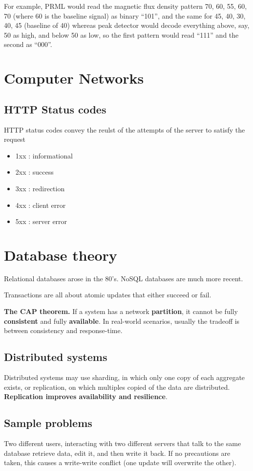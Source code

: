 \documentclass[oneside]{book} %
\theoremstyle{plain}
\begin{document}
For example, PRML would read the magnetic flux density pattern 70, 60, 55, 60,
70 (where 60 is the baseline signal) as binary ``101'', and the same for 45, 40,
30, 40, 45 (baseline of 40) whereas peak detector would decode everything
above, say, 50 as high, and below 50 as low, so the first pattern would read
``111'' and the second as ``000''.

\chapter{Computer Networks}
\section{HTTP Status codes}
HTTP status codes convey the reulst of the attempts of the server to satisfy the
request
\begin{itemize}
 \item 1xx : informational
 \item 2xx : success
 \item 3xx : redirection
 \item 4xx : client error
 \item 5xx : server error
\end{itemize}

\chapter{Database theory}
Relational databases arose in the 80's. NoSQL databases are much more recent.

Transactions are all about atomic updates that either succeed or fail.

\textbf{The CAP theorem.} If a system has a network \textbf{partition}, it
cannot be fully \textbf{consistent} and fully \textbf{available}. In real-world
scenarios, usually the tradeoff is between consistency and response-time.

\section{Distributed systems}
Distributed systems may use sharding, in which only one copy of each aggregate
exists, or replication, on which multiples copied of the data are distributed.
\textbf{Replication improves availability and resilience}.

\section{Sample problems}
Two different users, interacting with two different servers that talk to the
same database retrieve data, edit it, and then write it back. If no precautions
are taken, this causes a write-write conflict (one update will overwrite the
other).
\end{document}
